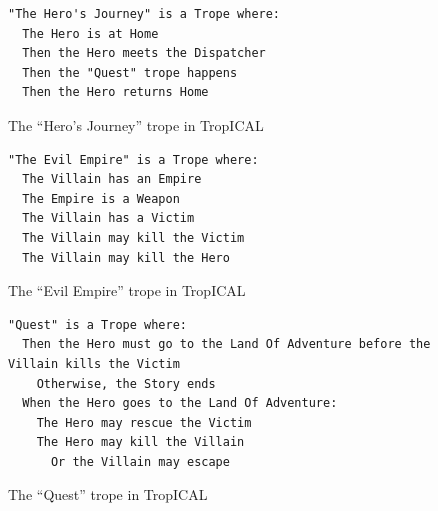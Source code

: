 \begin{figure}[!t]
\begin{lstlisting}
"The Hero's Journey" is a Trope where:
  The Hero is at Home
  Then the Hero meets the Dispatcher
  Then the "Quest" trope happens
  Then the Hero returns Home
\end{lstlisting}%
\caption{The ``Hero's Journey'' trope in TropICAL\label{lst:hero}}
\medskip
\begin{lstlisting}
"The Evil Empire" is a Trope where:
  The Villain has an Empire
  The Empire is a Weapon
  The Villain has a Victim
  The Villain may kill the Victim
  The Villain may kill the Hero
\end{lstlisting}%
\caption{The ``Evil Empire'' trope in TropICAL\label{lst:evil}}
\medskip
\begin{lstlisting}
"Quest" is a Trope where:
  Then the Hero must go to the Land Of Adventure before the Villain kills the Victim
    Otherwise, the Story ends
  When the Hero goes to the Land Of Adventure:
    The Hero may rescue the Victim
    The Hero may kill the Villain
      Or the Villain may escape
\end{lstlisting}
\caption{The ``Quest'' trope in TropICAL\label{lst:quest}}
\end{figure}

